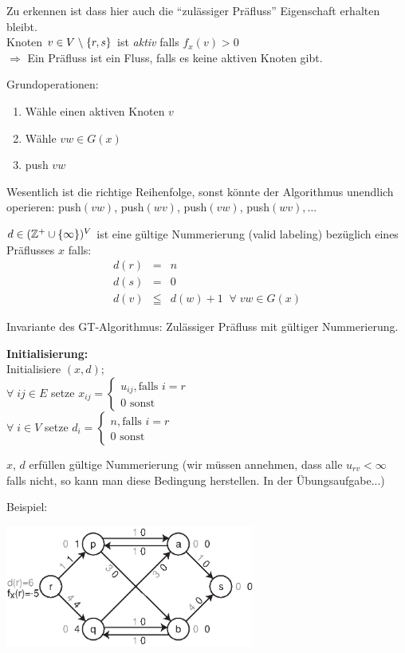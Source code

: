 Zu erkennen ist dass hier auch die "`zulässiger Präfluss"' Eigenschaft
erhalten bleibt.\\
Knoten $v \in V \;\backslash\; \{r,s\}$ ist {\em aktiv} falls $f_{x}(v) > 0$\\
$\Rightarrow$ Ein Präfluss ist ein Fluss, falls es keine aktiven Knoten
gibt.

Grundoperationen:
\begin{enumerate}
\item Wähle einen aktiven Knoten $v$
\item Wähle $v w \in G(x)$
\item push $v w$
\end{enumerate} 
Wesentlich ist die richtige Reihenfolge, sonst könnte der Algorithmus
unendlich operieren: push$(v w)$, push$(w v)$, push$(v w)$, push$(w v),
\ldots$

$d \in (\mathbb{Z}^{+} \cup \{\infty\})^{V}$ ist eine gültige Nummerierung (valid
labeling) bezüglich eines Präflusses $x$ falls:
\[\begin{array}{rcl}
d(r)&=&n\\
d(s)&=& 0\\
d(v) &\leqq& d(w) +1 \; \; \forall \; v w \in G(x)  
\end{array}\]

Invariante des GT-Algorithmus: Zulässiger Präfluss mit gültiger Nummerierung.

{\bf Initialisierung:}\\
Initialisiere $(x,d)$;\\
$\forall \; i j \in E$ setze  $x_{i j} = \left\{ \begin{array}{l}u_{i j}, \mbox{
falls } i=r\\ 0 \mbox{ sonst}\end{array} \right.$\\
$\forall \; i \in V$ setze $d_{i} = \left\{ \begin{array}{l}n, \mbox{
falls } i=r\\ 0 \mbox{ sonst}\end{array} \right.$

$x$, $d$ erfüllen gültige Nummerierung (wir müssen annehmen, dass alle
$u_{r v} < \infty$ falls nicht, so kann man diese Bedingung herstellen. In
der Übungsaufgabe...)

Beispiel:

\includegraphics[height=4cm]{bilder/3-0GoldbTarjan}

